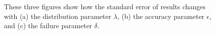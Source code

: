 \documentclass{scrartcl}
\begin{document}
\begin{figure}[pt]
\centering
{}
\caption{These three figures show how the standard error of results changes with (a) the distribution parameter $\lambda$, (b) the accuracy parameter $\epsilon$, and (c) the failure parameter $\delta$.}
\label{fig1}
\end{figure}
\end{document}
